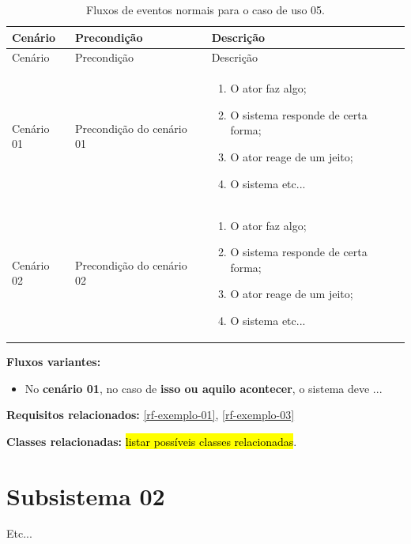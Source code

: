 \begin{longtable}{|p{2.3cm}|p{2.5cm}|p{10cm}|}
	\caption{Fluxos de eventos normais para o caso de uso 05.}
	\label{tbl-casos-de-uso-subsistema-01-exemplo-05} \\\hline 
	
	\rowcolor{lightgray}
	Cenário & Precondição & Descrição \\\hline	
	\endfirsthead
	\hline
	\rowcolor{lightgray}
	Cenário & Precondição & Descrição \\\hline
	\endhead
	
	Cenário 01 & Precondição do cenário 01 & 
	\begin{enumerate}[nosep,leftmargin=8mm]\vspace{-6mm}
			\item O ator faz algo;
			\item O sistema responde de certa forma;
			\item O ator reage de um jeito;
			\item O sistema etc...
	\vspace{-4mm}\end{enumerate} \\\hline

	Cenário 02 & Precondição do cenário 02 & 
	\begin{enumerate}[nosep,leftmargin=8mm]\vspace{-6mm}
		\item O ator faz algo;
		\item O sistema responde de certa forma;
		\item O ator reage de um jeito;
		\item O sistema etc...
	\vspace{-4mm}\end{enumerate} \\\hline
\end{longtable}


\noindent\textbf{Fluxos variantes:}\vspace{-4mm}
\begin{itemize}
	\item No \textbf{cenário 01}, no caso de \textbf{isso ou aquilo acontecer}, o sistema deve ...
\end{itemize}

\noindent\textbf{Requisitos relacionados:} \ref{rf-exemplo-01}, \ref{rf-exemplo-03}

\noindent\textbf{Classes relacionadas:} \hl{listar possíveis classes relacionadas}.
\newpage


\section{Subsistema 02}
\label{sec-casos-de-uso-subsistema-02}

Etc...